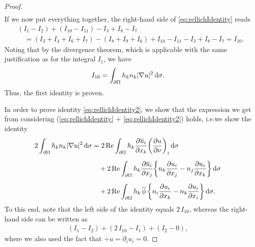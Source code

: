 \begin{proof}
\begin{align*}
  \end{align*}
  If we now put everything together, the right-hand side of \eqref{eq:rellichIdentity} reads
  \begin{align*}
    &(I_1 - I_2) + (I_{10} - I_{11}) - I_3 + I_8 - I_7 \\
    &\quad= (I_3 + I_4 + I_6 + I_7) - (I_8 + I_9 + I_6) + I_{10} - I_{11} - I_3 + I_8 - I_7 = I_{10}.
  \end{align*}
  Noting that by the divergence theorem, which is applicable with the same justification as for the integral $I_1$, we have
  \begin{align*}
    I_{10} = \int_{\partial\Omega} h_k n_k |\nabla u|^2 \, {\operatorname{d}\!{\sigma}}.
  \end{align*}
  Thus, the first identity is proven.

  In order to prove identity \eqref{eq:rellichIdentity2}, we show that the expression we get from considering (\eqref{eq:rellichIdentity} + \eqref{eq:rellichIdentity2}) holds, i.e.\@ we show the identity
  \begin{align*}
    2 \int_{\partial\Omega} h_k n_k |\nabla u|^2 \, {\operatorname{d}\!{\sigma}}
    &= 2 \operatorname{Re} \int_{\partial\Omega} h_k \frac{\partial \overline u_i}{\partial x_k} \bigg( \frac{\partial u}{\partial \nu} \bigg)_i \, {\operatorname{d}\!{\sigma}} \\[0.5em]
    &\quad + 2 \operatorname{Re} \int_{\partial\Omega} h_k \frac{\partial\overline u_i}{\partial x_j} \bigg\{ n_k \frac{\partial u_i}{\partial x_j} - n_j \frac{\partial u_i}{\partial x_k} \bigg\} \, {\operatorname{d}\!{\sigma}} \\[0.5em]
    &\quad+ 2 \operatorname{Re} \int_{\partial\Omega} h_k \, \overline \phi\,  \bigg\{ n_i \frac{\partial u_i}{\partial x_k} - n_k \frac{\partial u_i}{\partial x_i} \bigg\} \, {\operatorname{d}\!{\sigma}}.
  \end{align*}
  To this end, note that the left side of the identity equals $2\, I_{10}$, whereas the right-hand side can be written as 
  \begin{align*}
    (I_1 - I_2) + ( 2 \, I_{10} - I_1) + (I_2 - 0),
  \end{align*}
  where we also used the fact that $\div u = \partial_i u_i = 0$.
\end{proof}

